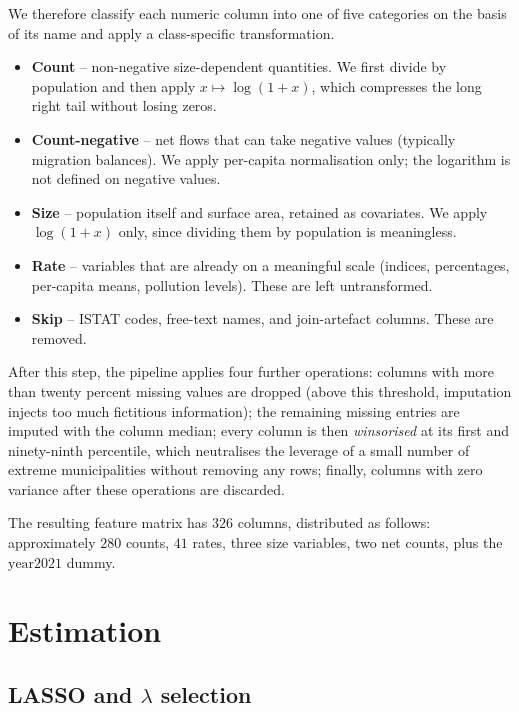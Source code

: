 \documentclass[11pt,a4paper]{article}
\begin{document}
We therefore classify each numeric column into one of five categories
on the basis of its name and apply a class-specific transformation.
\begin{itemize}[leftmargin=2em]
  \item \textbf{Count} -- non-negative size-dependent quantities. We
    first divide by population and then apply \(x\mapsto\log(1+x)\),
    which compresses the long right tail without losing zeros.
  \item \textbf{Count-negative} -- net flows that can take negative
    values (typically migration balances). We apply per-capita
    normalisation only; the logarithm is not defined on negative values.
  \item \textbf{Size} -- population itself and surface area, retained
    as covariates. We apply \(\log(1+x)\) only, since dividing them by
    population is meaningless.
  \item \textbf{Rate} -- variables that are already on a meaningful
    scale (indices, percentages, per-capita means, pollution levels).
    These are left untransformed.
  \item \textbf{Skip} -- ISTAT codes, free-text names, and
    join-artefact columns. These are removed.
\end{itemize}

After this step, the pipeline applies four further operations:
columns with more than twenty percent missing values are dropped (above
this threshold, imputation injects too much fictitious information);
the remaining missing entries are imputed with the column median;
every column is then \emph{winsorised} at its first and ninety-ninth
percentile, which neutralises the leverage of a small number of
extreme municipalities without removing any rows; finally, columns with
zero variance after these operations are discarded.

The resulting feature matrix has \(326\) columns, distributed as
follows: approximately \(280\) counts, \(41\) rates, three size
variables, two net counts, plus the \(\text{year2021}\) dummy.

\section{Estimation}
\label{sec:estimation}

\subsection{LASSO and \(\lambda\) selection}
\end{document}
